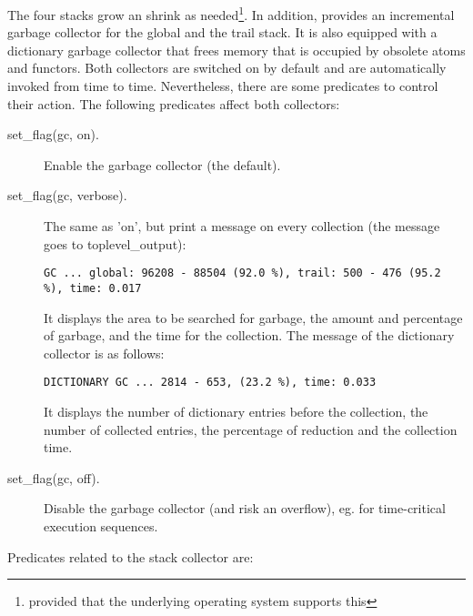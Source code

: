 The four stacks grow an shrink as needed\footnote{provided that the underlying
operating system supports this}.
In addition, {\eclipse} provides an incremental garbage collector
for the global and the trail stack.
It is also equipped with a dictionary garbage
collector that frees memory that is occupied by obsolete atoms and functors.
Both collectors are switched on by default and are automatically invoked
from time to time.
Nevertheless, there are some predicates to control their action.
The following predicates affect both collectors:
\begin{description}
\item [set\_flag(gc, on).]
	Enable the garbage collector (the default).
\item [set\_flag(gc, verbose).]
	The same as 'on', but print a message on every collection
	(the message goes to toplevel\_output):
{\small
\begin{verbatim}
GC ... global: 96208 - 88504 (92.0 %), trail: 500 - 476 (95.2 %), time: 0.017
\end{verbatim}
}
	It displays the area to be searched for garbage, the amount
	and percentage of garbage, and the time for the collection.
	The message of the dictionary collector is as follows:
{\small
\begin{verbatim}
DICTIONARY GC ... 2814 - 653, (23.2 %), time: 0.033
\end{verbatim}
}
	It displays the number of dictionary entries before the collection,
	the number of collected entries, the percentage of reduction and
	the collection time.
\item [set\_flag(gc, off).]
	Disable the garbage collector (and risk an overflow), eg. for
	time-critical execution sequences.
\end{description}
\noindent Predicates related to the stack collector are:
